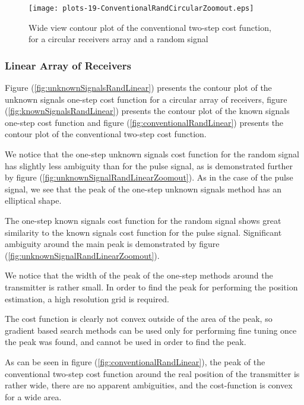 \begin{figure}
\begin{center}
\texttt{[image: plots-19-ConventionalRandCircularZoomout.eps]} 
\end{center}
\caption{Wide view contour plot of the conventional two-step cost function, for a circular receivers array and a random signal}
\label{fig:conventionalSignalRandCircularZoomout}
\end{figure}

\subsubsection*{Linear Array of Receivers}
Figure (\ref{fig:unknownSignalsRandLinear}) presents the contour plot of the unknown signals one-step cost function for a circular array of receivers, figure (\ref{fig:knownSignalsRandLinear}) presents the contour plot of the known signals one-step cost function and figure (\ref{fig:conventionalRandLinear}) presents the contour plot of the conventional two-step cost function.

We notice that the one-step unknown signals cost function for the random signal has slightly less ambiguity than for the pulse signal, as is demonstrated further by figure (\ref{fig:unknownSignalRandLinearZoomout}).
As in the case of the pulse signal, we see that the peak of the one-step unknown signals method has an elliptical shape.

The one-step known signals cost function for the random signal shows great similarity to the known signals cost function for the pulse signal. Significant ambiguity around the main peak is demonstrated by figure (\ref{fig:unknownSignalRandLinearZoomout}).

We notice that the width of the peak of the one-step methods around the transmitter is rather small. In order to find the peak for performing the position estimation, a high resolution grid is required. 

The cost function is clearly not convex outside of the area of the peak, so gradient based search methods can be used only for performing fine tuning once the peak was found, and cannot be used in order to find the peak.

As can be seen in figure (\ref{fig:conventionalRandLinear}), the peak of the conventional two-step cost function around the real position of the transmitter is rather wide, there are no apparent ambiguities, and the cost-function is convex for a wide area. 

